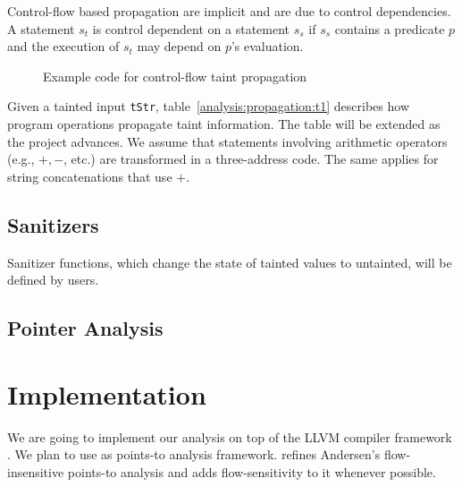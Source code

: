 Control-flow based propagation are implicit and are due to
control dependencies. A statement $s_t$ is control dependent on
a statement $s_s$ if $s_s$ contains a predicate $p$ and the execution
of $s_t$ may depend on $p$'s evaluation.

\begin{figure}[!h]
\begin{center}
\end{center}
\caption{Example code for control-flow taint propagation}
\label{fig:cfpropagation}
\end{figure}

Given a tainted input \texttt{tStr}, table~\ref{analysis:propagation:t1}
describes how program operations propagate taint information. The table
will be extended as the project advances.
We assume that statements involving arithmetic operators (e.g., $+, -$, etc.)
are transformed in a three-address code. The same applies for string
concatenations that use $+$.

\subsection{Sanitizers}\label{analysis:sanitizers}

Sanitizer functions, which change the state of tainted values
to untainted, will be defined by users.

\subsection{Pointer Analysis}\label{analysis:pointers}

\section{Implementation}

We are going to implement our analysis on top of the LLVM
compiler framework \cite{Lattner:2004:LLVM}.
We plan to use \cite{Lhotak:2011:PAE} as points-to analysis
framework. \cite{Lhotak:2011:PAE} refines Andersen's
flow-insensitive points-to analysis and adds flow-sensitivity
to it whenever possible.